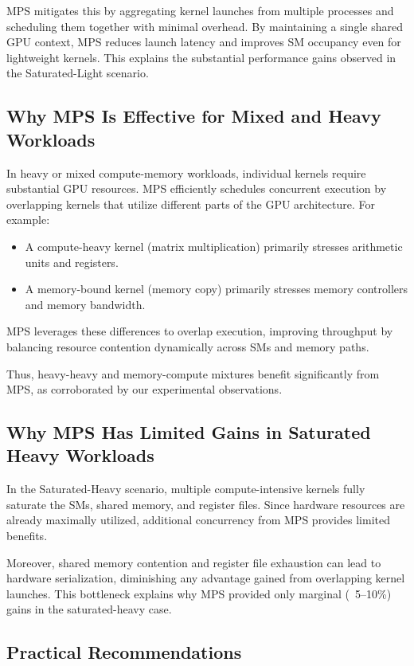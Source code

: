 \documentclass[sigconf,nonacm]{acmart}
\begin{document}
MPS mitigates this by aggregating kernel launches from multiple processes and scheduling them together with minimal overhead. By maintaining a single shared GPU context, MPS reduces launch latency and improves SM occupancy even for lightweight kernels. This explains the substantial performance gains observed in the Saturated-Light scenario.

\subsection{Why MPS Is Effective for Mixed and Heavy Workloads}

In heavy or mixed compute-memory workloads, individual kernels require substantial GPU resources. MPS efficiently schedules concurrent execution by overlapping kernels that utilize different parts of the GPU architecture. For example:

\begin{itemize}
    \item A compute-heavy kernel (matrix multiplication) primarily stresses arithmetic units and registers.
    \item A memory-bound kernel (memory copy) primarily stresses memory controllers and memory bandwidth.
\end{itemize}

MPS leverages these differences to overlap execution, improving throughput by balancing resource contention dynamically across SMs and memory paths.

Thus, heavy-heavy and memory-compute mixtures benefit significantly from MPS, as corroborated by our experimental observations.

\subsection{Why MPS Has Limited Gains in Saturated Heavy Workloads}

In the Saturated-Heavy scenario, multiple compute-intensive kernels fully saturate the SMs, shared memory, and register files. Since hardware resources are already maximally utilized, additional concurrency from MPS provides limited benefits.

Moreover, shared memory contention and register file exhaustion can lead to hardware serialization, diminishing any advantage gained from overlapping kernel launches. This bottleneck explains why MPS provided only marginal (~5–10\%) gains in the saturated-heavy case.

\subsection{Practical Recommendations}
\end{document}
